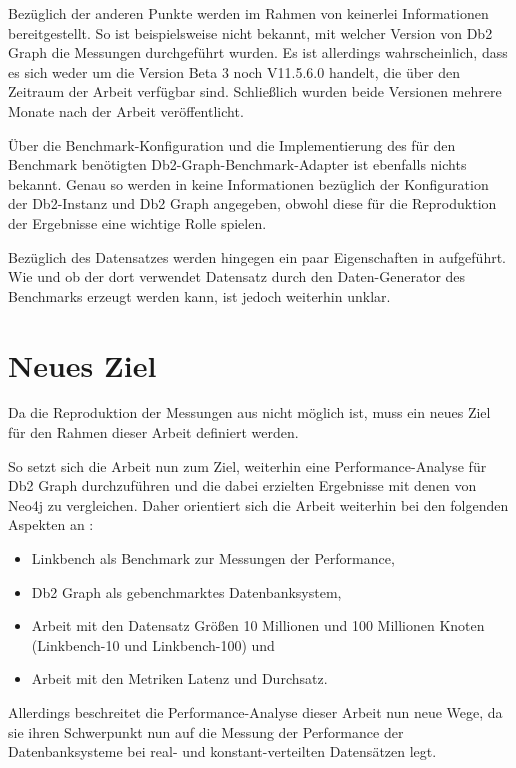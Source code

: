 Bezüglich der anderen Punkte werden im Rahmen von \cite{sigmod_tian} keinerlei Informationen bereitgestellt. So ist beispielsweise nicht bekannt, mit welcher Version von Db2 Graph die Messungen durchgeführt wurden. Es ist allerdings wahrscheinlich, dass es sich weder um die Version Beta 3 noch V11.5.6.0 handelt, die über den Zeitraum der Arbeit verfügbar sind. Schließlich wurden beide Versionen mehrere Monate nach der Arbeit veröffentlicht. 

Über die Benchmark-Konfiguration und die Implementierung des für den Benchmark benötigten Db2-Graph-Benchmark-Adapter ist ebenfalls nichts bekannt. Genau so werden in \cite{sigmod_tian} keine Informationen bezüglich der Konfiguration der Db2-Instanz und Db2 Graph angegeben, obwohl diese für die Reproduktion der Ergebnisse eine wichtige Rolle spielen. 

Bezüglich des Datensatzes werden hingegen ein paar Eigenschaften in \cite{sigmod_tian} aufgeführt. Wie und ob der dort verwendet Datensatz durch den Daten-Generator des Benchmarks erzeugt werden kann, ist jedoch weiterhin unklar.

\section{Neues Ziel}
Da die Reproduktion der Messungen aus \cite{sigmod_tian} nicht möglich ist, muss ein neues Ziel für den Rahmen dieser Arbeit definiert werden. 

So setzt sich die Arbeit nun zum Ziel, weiterhin eine Performance-Analyse für Db2 Graph durchzuführen und die dabei erzielten Ergebnisse mit denen von Neo4j zu vergleichen. Daher orientiert sich die Arbeit weiterhin bei den folgenden Aspekten an \cite{sigmod_tian}:
\begin{itemize}
    \item Linkbench als Benchmark zur Messungen der Performance,
    \item Db2 Graph als gebenchmarktes Datenbanksystem,
    \item Arbeit mit den Datensatz Größen 10 Millionen und 100 Millionen Knoten (Linkbench-10 und Linkbench-100) und
    \item Arbeit mit den Metriken Latenz und Durchsatz.  
\end{itemize}
Allerdings beschreitet die Performance-Analyse dieser Arbeit nun neue Wege, da sie ihren Schwerpunkt nun auf die Messung der Performance der Datenbanksysteme bei real- und konstant-verteilten Datensätzen legt. 

